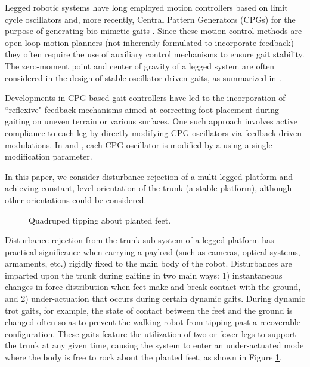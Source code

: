 
Legged robotic systems have long employed motion controllers based on limit cycle oscillators and, more recently, Central Pattern Generators (CPGs)  for the purpose of generating bio-mimetic gaits \cite{Matsuoka1985,Collins1993,Endo2004,Righetti2006,Ijspeert2008,Matos2010,Ajallooeian2013,Park2014,Fukuoka2015}. Since these motion control methods are open-loop motion planners (\IE not inherently formulated to incorporate feedback) they often require the use of auxiliary control mechanisms to ensure gait stability. The zero-moment point and center of gravity of a legged system are often considered in the design of stable oscillator-driven gaits, as summarized in \cite{Wieber2015}. %

Developments in CPG-based gait controllers have led to the incorporation of ``reflexive" feedback mechanisms aimed at correcting foot-placement during gaiting on uneven terrain or various surfaces. One such approach involves active compliance to each leg by directly modifying CPG oscillators via feedback-driven modulations. In \cite{Endo2004} and \cite{Fukuoka2003}, each CPG oscillator is modified by a using a single modification parameter.

In this paper, we consider disturbance rejection of a multi-legged platform and achieving constant, level orientation of the trunk (\IE a stable platform), although other orientations could be considered. 
	\begin{figure}[t!]
		\vspace{2mm}
		\centering
		\caption{ Quadruped tipping about planted feet.}
		\label{fig::quadruped_walking}
		\vspace{-7mm}
	\end{figure}
Disturbance rejection from the trunk sub-system of a legged platform has practical significance when carrying a payload (such as cameras, optical systems, armaments, etc.) rigidly fixed to the main body of the robot. Disturbances are imparted upon the trunk during gaiting in two main ways: 1) instantaneous changes in force distribution when feet make and break contact with the ground, and 2) under-actuation that occurs during certain dynamic gaits. During dynamic trot gaits, for example, the state of contact between the feet and the ground is changed often so as to prevent the walking robot from tipping past a recoverable configuration. These gaits feature the utilization of two or fewer legs to support the trunk at any given time, causing the system to enter an under-actuated mode where the body is free to rock about the planted feet, as shown in Figure \ref{fig::quadruped_walking}.

